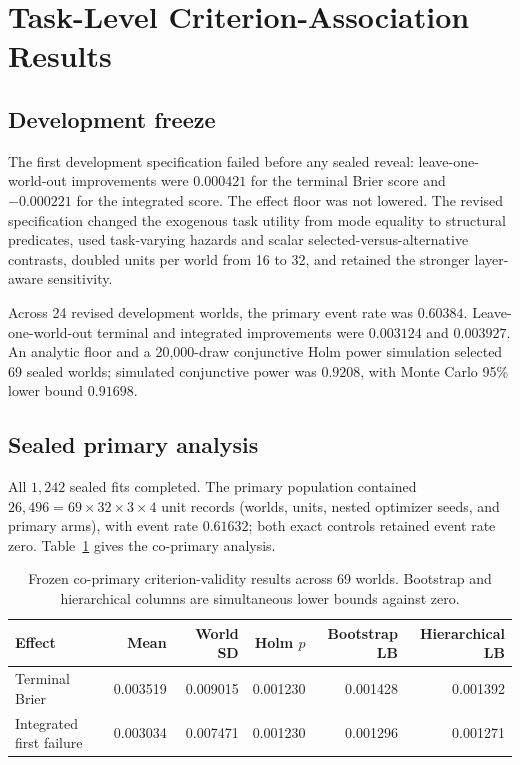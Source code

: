 \section{Task-Level Criterion-Association Results}
\label{sec:validity-results}

\subsection{Development freeze}

The first development specification failed before any sealed reveal:
leave-one-world-out improvements were \(0.000421\) for the terminal Brier score
and \(-0.000221\) for the integrated score.  The effect floor was not lowered.
The revised specification changed the exogenous task utility from mode equality
to structural predicates, used task-varying hazards and scalar
selected-versus-alternative contrasts, doubled units per world from 16 to 32,
and retained the stronger layer-aware sensitivity.

Across 24 revised development worlds, the primary event rate was \(0.60384\).
Leave-one-world-out terminal and integrated improvements were \(0.003124\) and
\(0.003927\).  An analytic floor and a 20,000-draw conjunctive Holm power
simulation selected 69 sealed worlds; simulated conjunctive power was
\(0.9208\), with Monte Carlo 95\% lower bound \(0.91698\).

\subsection{Sealed primary analysis}

All \(1{,}242\) sealed fits completed.  The primary population contained
\(26{,}496=69\times32\times3\times4\) unit records (worlds, units, nested
optimizer seeds, and primary arms), with event rate \(0.61632\); both exact controls
retained event rate zero.  Table~\ref{tab:validity-primary} gives the
co-primary analysis.

\begin{table}[ht]
\centering
\caption{Frozen co-primary criterion-validity results across 69 worlds.
Bootstrap and hierarchical columns are simultaneous lower bounds against
zero.}
\label{tab:validity-primary}
\begin{tabular}{lrrrrr}
\toprule
Effect & Mean & World SD & Holm \(p\) & Bootstrap LB & Hierarchical LB \\
\midrule
Terminal Brier
& 0.003519 & 0.009015 & 0.001230 & 0.001428 & 0.001392 \\
Integrated first failure
& 0.003034 & 0.007471 & 0.001230 & 0.001296 & 0.001271 \\
\bottomrule
\end{tabular}
\end{table}

